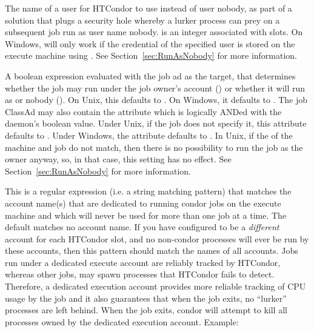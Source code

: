 \begin{description}
\label{param:SlotNUser}
\item[\Macro{SLOT<N>\_USER}]
  The name of a user for HTCondor to use instead of
  user nobody,
  as part of a solution that plugs a security hole whereby
  a lurker process can prey on a subsequent job run as user name nobody. 
   is an integer associated with slots.
  On Windows, 
  will only work if the credential of the specified
  user is stored on the execute machine using .
  See Section~\ref{sec:RunAsNobody} for more information.

\label{param:StarterAllowRunAsOwner}
\item[\Macro{STARTER\_ALLOW\_RUNAS\_OWNER}]
  A boolean expression evaluated with the job ad as the
  target, that determines whether the job may run under the job owner's
  account () or whether it will run as  or
  nobody ().  On Unix, this defaults to .
  On Windows, it defaults to .
  The job ClassAd may also contain the attribute
   which is logically ANDed with the  daemon's
  boolean value.  Under Unix, if the job does not specify it, this
  attribute defaults to .
  Under Windows, the attribute defaults to .
  In Unix, if the  of the machine and job do not
  match, then there is no possibility to run the job as the owner
  anyway, so, in that case, this setting has no effect.  See
  Section~\ref{sec:RunAsNobody} for more information.

\label{param:DedicatedExecuteAccountRegexp}
\item[\Macro{DEDICATED\_EXECUTE\_ACCOUNT\_REGEXP}]
  This is a regular expression (i.e. a string matching pattern) that
  matches the account name(s) that are dedicated to running condor
  jobs on the execute machine and which will never be used for more
  than one job at a time.  The default matches no account name.  If
  you have configured  to be a \emph{different}
  account for each HTCondor slot, and no non-condor processes will ever be
  run by these accounts, then this pattern should match the names of
  all  accounts.  Jobs run under a dedicated
  execute account are reliably tracked by HTCondor, whereas other jobs,
  may spawn processes that HTCondor fails to detect.  Therefore, a
  dedicated execution account provides more reliable tracking of CPU
  usage by the job and it also guarantees that when the job exits, no
  ``lurker'' processes are left behind.  When the job exits, condor
  will attempt to kill all processes owned by the dedicated execution
  account.  Example:


\end{description}
